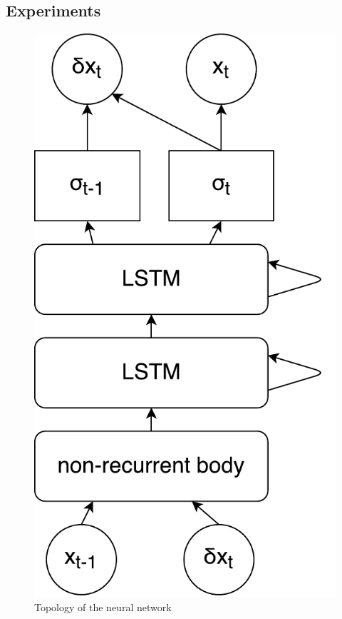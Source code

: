 \subsection{Experiments}
\begin{figure}
\centering
\includegraphics[width=0.35\linewidth]{varbolt/lstm_topo.pdf}
\caption[VarBOLT: Neural Network Topology]{\label{topo} Topology of the neural network}
\end{figure}

